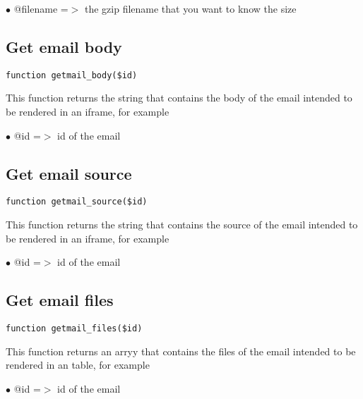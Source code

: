 \documentclass[a4paper]{book}
\begin{document}
\begin{compactitem}
\item[\color{myblue}$\bullet$] @filename =$>$ the gzip filename that you want to know the size
\end{compactitem}

\hypertarget{toc55}{}
\subsection{Get email body}

\begin{lstlisting}
function getmail_body($id)
\end{lstlisting}

This function returns the string that contains the body of the email
intended to be rendered in an iframe, for example

\begin{compactitem}
\item[\color{myblue}$\bullet$] @id =$>$ id of the email
\end{compactitem}

\hypertarget{toc56}{}
\subsection{Get email source}

\begin{lstlisting}
function getmail_source($id)
\end{lstlisting}

This function returns the string that contains the source of the email
intended to be rendered in an iframe, for example

\begin{compactitem}
\item[\color{myblue}$\bullet$] @id =$>$ id of the email
\end{compactitem}

\hypertarget{toc57}{}
\subsection{Get email files}

\begin{lstlisting}
function getmail_files($id)
\end{lstlisting}

This function returns an arryy that contains the files of the email
intended to be rendered in an table, for example

\begin{compactitem}
\item[\color{myblue}$\bullet$] @id =$>$ id of the email
\end{compactitem}
\end{document}
